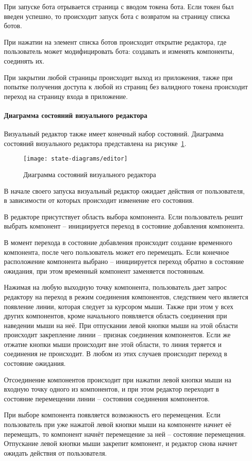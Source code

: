 При запуске бота отрывается страница с вводом токена бота. Если токен
был введен успешно, то происходит запуск бота с возвратом на страницу
списка ботов.

При нажатии на элемент списка ботов происходит открытие редактора,
где пользователь может модифицировать бота: создавать и изменять
компоненты, соединять их.

При закрытии любой страницы происходит выход из приложения, также
при попытке получения доступа к любой из страниц без валидного токена
происходит переход на страницу входа в приложение.

\paragraph{Диаграмма состояний визуального редактора}

Визуальный редактор также имеет конечный набор состояний.
Диаграмма состояний визуального редактора представлена на
рисунке~\ref{f:editor-state-diagram}.

\begin{figure}[ht]
	\centering
	\texttt{[image: state-diagrams/editor]}
	\caption{Диаграмма состояний визуального редактора}
	\label{f:editor-state-diagram}
\end{figure}


В начале своего запуска визуальный редактор ожидает действия от
пользователя, в зависимости от которых происходит изменение его состояния.

В редакторе присутствует область выбора компонента. Если
пользователь решит выбрать компонент – инициируется переход в состояние
добавления компонента.

В момент перехода в состояние добавления происходит создание
временного компонента, после чего пользователь может его перемещать. Если
конечное расположение компонента выбрано – инициируется переход обратно
в состояние ожидания, при этом временный компонент заменяется
постоянным.

Нажимая на любую выходную точку компонента, пользователь дает
запрос редактору на переход в режим соединения компонентов, следствием
чего является появление линии, которая следует за курсором мыши. Также при
этом у всех других компонентов, кроме начального появляется область
соединения при наведении мыши на неё. При отпускании левой кнопки мыши
на этой области происходит закрепление линии – признак соединения
компонентов. Если же отжатие кнопки мыши происходит вне этой области, то
линия теряется и соединения не происходит. В любом из этих случаев
происходит переход в состояние ожидания.

Отсоединение компонентов происходит при нажатии левой кнопки
мыши на входную точку одного из компонентов, и при этом редактор
переходит в состояние перемещении линии – состояния соединения
компонентов.

При выборе компонента появляется возможность его перемещения.
Если пользователь при уже нажатой левой кнопки мыши на компоненте
начнет её перемещать, то компонент начнёт перемещение за ней – состояние
перемещения. Отпускание левой кнопки мыши закрепит компонент, и
редактор снова начнет ожидать действия от пользователя.




